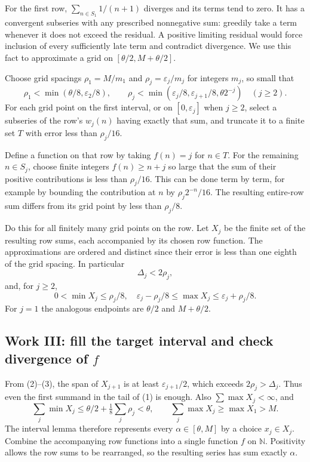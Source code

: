 For the first row, $\sum_{n\in S_1}1/(n+1)$ diverges and its terms tend to zero. It has a convergent subseries with any prescribed nonnegative sum: greedily take a term whenever it does not exceed the residual. A positive limiting residual would force inclusion of every sufficiently late term and contradict divergence. We use this fact to approximate a grid on $[\theta/2,M+\theta/2]$.

Choose grid spacings $\rho_1=M/m_1$ and $\rho_j=\varepsilon_j/m_j$ for integers $m_j$, so small that
\[
 \rho_1<\min(\theta/8,\varepsilon_2/8),\qquad
 \rho_j<\min(\varepsilon_j/8,\varepsilon_{j+1}/8,\theta2^{-j})\quad(j\ge2).
 \tag{2}
\]
For each grid point on the first interval, or on $[0,\varepsilon_j]$ when $j\ge2$, select a subseries of the row's $w_j(n)$ having exactly that sum, and truncate it to a finite set $T$ with error less than $\rho_j/16$.

Define a function on that row by taking $f(n)=j$ for $n\in T$. For the remaining $n\in S_j$, choose finite integers $f(n)\ge n+j$ so large that the sum of their positive contributions is less than $\rho_j/16$. This can be done term by term, for example by bounding the contribution at $n$ by $\rho_j2^{-n}/16$. The resulting entire-row sum differs from its grid point by less than $\rho_j/8$.

Do this for all finitely many grid points on the row. Let $X_j$ be the finite set of the resulting row sums, each accompanied by its chosen row function. The approximations are ordered and distinct since their error is less than one eighth of the grid spacing. In particular
\[
 \Delta_j<2\rho_j,
\]
and, for $j\ge2$,
\[
 0<\min X_j\le\rho_j/8,\quad
 \varepsilon_j-\rho_j/8\le\max X_j\le\varepsilon_j+\rho_j/8.
 \tag{3}
\]
For $j=1$ the analogous endpoints are $\theta/2$ and $M+\theta/2$.

\subsection{Work III: fill the target interval and check divergence of $f$}
From (2)--(3), the span of $X_{j+1}$ is at least $\varepsilon_{j+1}/2$, which exceeds $2\rho_j>\Delta_j$. Thus even the first summand in the tail of (1) is enough. Also $\sum\max X_j<\infty$, and
\[
 \sum_j\min X_j\le\theta/2+\tfrac18\sum_j\rho_j<\theta,
 \qquad \sum_j\max X_j\ge\max X_1>M.
\]
The interval lemma therefore represents every $\alpha\in[\theta,M]$ by a choice $x_j\in X_j$. Combine the accompanying row functions into a single function $f$ on $\mathbb N$. Positivity allows the row sums to be rearranged, so the resulting series has sum exactly $\alpha$.

